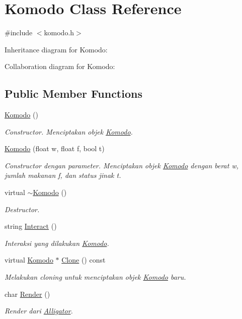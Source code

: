 \hypertarget{classKomodo}{}\section{Komodo Class Reference}
\label{classKomodo}


{\ttfamily \#include $<$komodo.\+h$>$}



Inheritance diagram for Komodo\+:


Collaboration diagram for Komodo\+:
\subsection*{Public Member Functions}
\begin{DoxyCompactItemize}
\item 
\hyperlink{classKomodo_a663a1a18bc7ac367f1a55a385604258d}{Komodo} ()
\begin{DoxyCompactList}\small\item\em Constructor. Menciptakan objek \hyperlink{classKomodo}{Komodo}. \end{DoxyCompactList}\item 
\hyperlink{classKomodo_ad98e389b1661efeeba847133e64c02e6}{Komodo} (float w, float f, bool t)
\begin{DoxyCompactList}\small\item\em Constructor dengan parameter. Menciptakan objek \hyperlink{classKomodo}{Komodo} dengan berat w, jumlah makanan f, dan status jinak t. \end{DoxyCompactList}\item 
virtual \hyperlink{classKomodo_a16e327cbffe1088c1f04c397c1fbc6dd}{$\sim$\+Komodo} ()
\begin{DoxyCompactList}\small\item\em Destructor. \end{DoxyCompactList}\item 
string \hyperlink{classKomodo_a250e6b06c369a94faaa551751cd09196}{Interact} ()
\begin{DoxyCompactList}\small\item\em Interaksi yang dilakukan \hyperlink{classKomodo}{Komodo}. \end{DoxyCompactList}\item 
virtual \hyperlink{classKomodo}{Komodo} $\ast$ \hyperlink{classKomodo_aab3bd7ee8235c87e8bbafd8848968be8}{Clone} () const 
\begin{DoxyCompactList}\small\item\em Melakukan cloning untuk menciptakan objek \hyperlink{classKomodo}{Komodo} baru. \end{DoxyCompactList}\item 
char \hyperlink{classKomodo_a06ce8ed3d58a33968ecf4a12a3ebbd4d}{Render} ()
\begin{DoxyCompactList}\small\item\em Render dari \hyperlink{classAlligator}{Alligator}. \end{DoxyCompactList}\end{DoxyCompactItemize}
